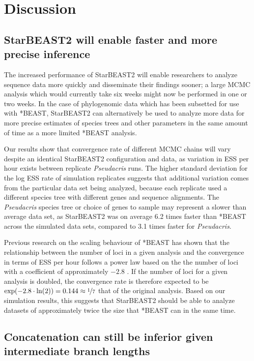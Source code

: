 \documentclass[nogrid]{MBE}%
\begin{document}
\section{Discussion}

\subsection{StarBEAST2 will enable faster and more precise inference}

The increased performance of StarBEAST2 will enable researchers to analyze
sequence data more quickly and disseminate their findings sooner; a large MCMC
analysis which would currently take six weeks might now be performed in one or two
weeks. In the case of phylogenomic data which has been subsetted for use with
*BEAST, StarBEAST2 can alternatively be used to analyze more data for more
precise estimates of species trees and other parameters in the same amount of
time as a more limited *BEAST analysis.

Our results show that convergence rate of different MCMC chains will vary
despite an identical StarBEAST2 configuration and data, as variation in ESS per
hour exists between replicate \textit{Pseudacris} runs. The
higher standard deviation for the log ESS rate of simulation replicates suggests
that additional variation comes from the particular data set being analyzed,
because each replicate used a different species tree with different genes and
sequence alignments. The \textit{Pseudacris} species tree or choice of genes to
sample may
represent a slower than average data set, as StarBEAST2 was on average 6.2 times
faster than *BEAST across the simulated data sets, compared to 3.1 times faster
for \textit{Pseudacris}.

Previous research on the scaling behaviour of *BEAST has shown that the
relationship between the number of loci in a given analysis and the convergence
in terms of ESS per hour follows a power law based on the
the number of loci with a coefficient of approximately $-2.8$ \citep{Ogilvie01052016}. If the number of loci for a
given analysis is doubled, the convergence rate is therefore
expected to be $\exp(-2.8 \cdot \ln(2)) = 0.144 \approx \nicefrac{1}{7}$ that
of the original analysis. Based on our simulation results, this suggests that
StarBEAST2 should be able to analyze datasets of approximately twice the size
that *BEAST can in the same time.

\subsection{Concatenation can still be inferior given intermediate branch lengths}
\end{document}
